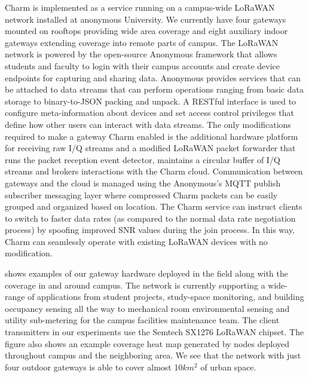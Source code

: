 Charm is implemented as a service running on a campus-wide LoRaWAN network installed at anonymous University.  We currently have four gateways mounted on rooftops providing wide area coverage and eight auxiliary indoor gateways extending coverage into remote parts of campus. The LoRaWAN network is powered by the open-source Anonymous framework that allows students and faculty to login with their campus accounts and create device endpoints for capturing and sharing data.  Anonymous provides services that can be attached to data streams that can perform operations ranging from basic data storage to binary-to-JSON packing and unpack. A RESTful interface is used to configure meta-information about devices and set access control privileges that define how other users can interact with data streams.  The only modifications required to make a gateway Charm enabled is the additional hardware platform for receiving raw I/Q streams and a modified LoRaWAN packet forwarder that runs the packet reception event detector, maintains a circular buffer of I/Q streams and brokers interactions with the Charm cloud.  Communication between gateways and the cloud is managed using the Anonymous's MQTT publish subscriber messaging layer where compressed Charm packets can be easily grouped and organized based on location.  The Charm service can instruct clients to switch to faster data rates (as compared to the normal data rate negotiation process) by spoofing improved SNR values during the join process. In this way, Charm can seamlessly operate with existing LoRaWAN devices with no modification.

 shows examples of our gateway hardware deployed in the field along with the coverage in and around campus.  The network is currently supporting a wide-range of applications from student projects, study-space monitoring, and building occupancy sensing all the way to mechanical room environmental sensing and utility sub-metering for the campus facilities maintenance team.  The client transmitters in our experiments use the Semtech SX1276 LoRaWAN chipset. The figure also shows an example coverage heat map generated by nodes deployed throughout campus and the neighboring area.  We see that the network with just four outdoor gateways is able to cover almost 10$km^2$ of urban space.

